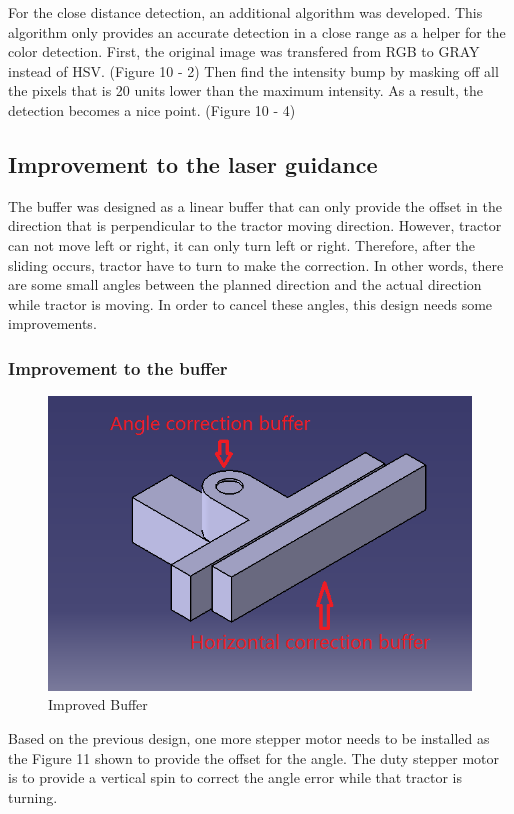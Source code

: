 \documentclass[12pt]{article}
\begin{document}
\begin{flushleft}
\begin{itemize}
	For the close distance detection, an additional algorithm was developed. This algorithm only  provides an accurate detection in a close range as a helper for the color detection. First, the original image was transfered from RGB to GRAY instead of HSV. (Figure 10 - 2) Then find the intensity bump by masking off all the pixels that is 20 units lower than the maximum intensity. As a result, the detection becomes a nice point. (Figure 10 - 4)
\end{itemize}

\subsection{Improvement to the laser guidance}

The buffer was designed as a linear buffer that can only provide the offset in the direction that is perpendicular to the tractor moving direction. However, tractor can not move left or right, it can only turn left or right. Therefore, after the sliding occurs, tractor have to turn to make the correction. In other words, there are some small angles between the planned direction and the actual direction while tractor is moving. In order to cancel these angles, this design needs some improvements.

\subsubsection{Improvement to the buffer}
\begin{figure}[ht!]
	\begin{center}
		\includegraphics[scale = 0.8]{improvedbuffer.png}
		\caption{Improved Buffer}
	\end{center}
\end{figure}
Based on the previous design, one more stepper motor needs to be installed as the Figure 11 shown to provide the offset for the angle. The duty stepper motor is to provide a vertical spin to correct the angle error while that tractor is turning. 


\end{flushleft}
\end{document}
